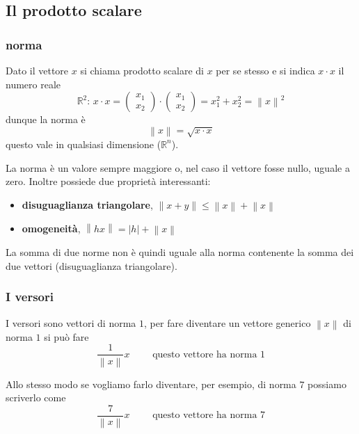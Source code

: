 \documentclass[../main.tex]{subfiles}
\begin{document}
\subsection{Il prodotto scalare}
\subsubsection{norma}
Dato il vettore $x$ si chiama prodotto scalare di $x$ per se stesso e si indica $x \cdot x$ il numero reale
$$
   \mathbb{R}^2 \text{: } x \cdot x = \begin{pmatrix} x_1 \\ x_2 \end{pmatrix} \cdot \begin{pmatrix} x_1 \\ x_2 \end{pmatrix} 
   = x^2_1 + x^2_2 = \left\lVert x \right\rVert^2
$$
dunque la norma è
$$
    \left\lVert x \right\rVert = \sqrt{x \cdot x}
$$
questo vale in qualsiasi dimensione ($\mathbb{R}^n$).

\vspace{0.5cm}
La norma è un valore sempre maggiore o, nel caso il vettore fosse nullo, uguale a zero. Inoltre possiede due proprietà interessanti:
\begin{itemize}
    \item \textbf{disuguaglianza triangolare}, $\left\lVert x + y \right\rVert \leq \left\lVert x \right\rVert + \left\lVert x \right\rVert$
    \item \textbf{omogeneità}, $\left\lVert hx \right\rVert = \left\lvert h \right\rvert + \left\lVert x \right\rVert $
\end{itemize}
La somma di due norme non è quindi uguale alla norma contenente la somma dei due vettori (disuguaglianza triangolare).

\subsubsection{I versori}
I versori sono vettori di norma $1$, per fare diventare un vettore generico $\left\lVert x \right\rVert$ di norma $1$ si può fare
$$
    \frac{1}{\left\lVert x \right\rVert } x  \phantom{--}\text{ questo vettore ha norma 1}
$$

Allo stesso modo se vogliamo farlo diventare, per esempio, di norma $7$ possiamo scriverlo come
$$
    \frac{7}{\left\lVert x \right\rVert } x \phantom{--} \text{ questo vettore ha norma 7}
$$
\end{document}
